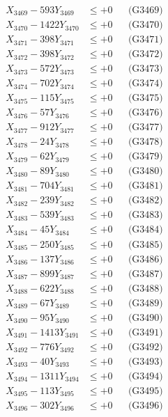 \documentclass[a4paper,10pt]{article}
\begin{document}
{\begin{align}
X_{3469} - 593Y_{3469} &\leq +0 && \text{(G3469)} \\
X_{3470} - 1422Y_{3470} &\leq +0 && \text{(G3470)} \\
\allowbreak
X_{3471} - 398Y_{3471} &\leq +0 && \text{(G3471)} \\
X_{3472} - 398Y_{3472} &\leq +0 && \text{(G3472)} \\
X_{3473} - 572Y_{3473} &\leq +0 && \text{(G3473)} \\
X_{3474} - 702Y_{3474} &\leq +0 && \text{(G3474)} \\
X_{3475} - 115Y_{3475} &\leq +0 && \text{(G3475)} \\
X_{3476} - 57Y_{3476} &\leq +0 && \text{(G3476)} \\
X_{3477} - 912Y_{3477} &\leq +0 && \text{(G3477)} \\
X_{3478} - 24Y_{3478} &\leq +0 && \text{(G3478)} \\
X_{3479} - 62Y_{3479} &\leq +0 && \text{(G3479)} \\
X_{3480} - 89Y_{3480} &\leq +0 && \text{(G3480)} \\
\allowbreak
X_{3481} - 704Y_{3481} &\leq +0 && \text{(G3481)} \\
X_{3482} - 239Y_{3482} &\leq +0 && \text{(G3482)} \\
X_{3483} - 539Y_{3483} &\leq +0 && \text{(G3483)} \\
X_{3484} - 45Y_{3484} &\leq +0 && \text{(G3484)} \\
X_{3485} - 250Y_{3485} &\leq +0 && \text{(G3485)} \\
X_{3486} - 137Y_{3486} &\leq +0 && \text{(G3486)} \\
X_{3487} - 899Y_{3487} &\leq +0 && \text{(G3487)} \\
X_{3488} - 622Y_{3488} &\leq +0 && \text{(G3488)} \\
X_{3489} - 67Y_{3489} &\leq +0 && \text{(G3489)} \\
X_{3490} - 95Y_{3490} &\leq +0 && \text{(G3490)} \\
\allowbreak
X_{3491} - 1413Y_{3491} &\leq +0 && \text{(G3491)} \\
X_{3492} - 776Y_{3492} &\leq +0 && \text{(G3492)} \\
X_{3493} - 40Y_{3493} &\leq +0 && \text{(G3493)} \\
X_{3494} - 1311Y_{3494} &\leq +0 && \text{(G3494)} \\
X_{3495} - 113Y_{3495} &\leq +0 && \text{(G3495)} \\
X_{3496} - 302Y_{3496} &\leq +0 && \text{(G3496)} \\

\end{align}}
\end{document}

